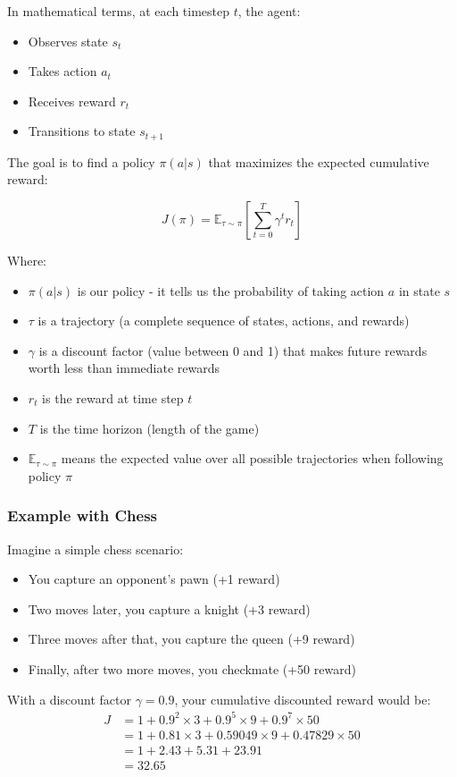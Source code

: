 \documentclass[11pt]{article}
\begin{document}
In mathematical terms, at each timestep $t$, the agent:
\begin{itemize}
    \item Observes state $s_t$
    \item Takes action $a_t$
    \item Receives reward $r_t$
    \item Transitions to state $s_{t+1}$
\end{itemize}

The goal is to find a policy $\pi(a|s)$ that maximizes the expected cumulative reward:

\begin{equation}
    J(\pi) = \mathbb{E}_{\tau \sim \pi} \left[ \sum_{t=0}^{T} \gamma^t r_t \right]
\end{equation}

Where:
\begin{itemize}
    \item $\pi(a|s)$ is our policy - it tells us the probability of taking action $a$ in state $s$
    \item $\tau$ is a trajectory (a complete sequence of states, actions, and rewards)
    \item $\gamma$ is a discount factor (value between 0 and 1) that makes future rewards worth less than immediate rewards
    \item $r_t$ is the reward at time step $t$
    \item $T$ is the time horizon (length of the game)
    \item $\mathbb{E}_{\tau \sim \pi}$ means the expected value over all possible trajectories when following policy $\pi$
\end{itemize}

\subsubsection*{Example with Chess}
Imagine a simple chess scenario:
\begin{itemize}
    \item You capture an opponent's pawn (+1 reward)
    \item Two moves later, you capture a knight (+3 reward)
    \item Three moves after that, you capture the queen (+9 reward)
    \item Finally, after two more moves, you checkmate (+50 reward)
\end{itemize}

With a discount factor $\gamma = 0.9$, your cumulative discounted reward would be:
\begin{align*}
    J &= 1 + 0.9^2 \times 3 + 0.9^5 \times 9 + 0.9^7 \times 50 \\
    &= 1 + 0.81 \times 3 + 0.59049 \times 9 + 0.47829 \times 50 \\
    &= 1 + 2.43 + 5.31 + 23.91 \\
    &= 32.65
\end{align*}
\end{document}
